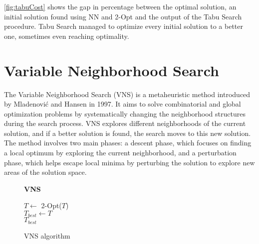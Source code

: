 \figurename{ \ref{fig:tabuCost}} shows the gap in percentage between the optimal solution, an initial solution found using NN and 2-Opt and the output of the Tabu Search procedure.
Tabu Search managed to optimize every initial solution to a better one, sometimes even reaching optimality.



\newpage
\section{Variable Neighborhood Search}

The Variable Neighborhood Search (VNS) is a metaheuristic method introduced by Mladenović and Hansen in 1997\cite{vnsWikipedia}.
It aims to solve combinatorial and global optimization problems by systematically changing the neighborhood structures during the search process.
VNS explores different neighborhoods of the current solution, and if a better solution is found, the search moves to this new solution.
The method involves two main phases: a descent phase, which focuses on finding a local optimum by exploring the current neighborhood, and a perturbation phase, which helps escape local minima by perturbing the solution to explore new areas of the solution space.

\begin{figure}[htbp]
    \textbf{VNS} \\
    \begin{algorithm}[H]
        \BlankLine
        $T \gets$ 2-Opt($T$)\\
        $T_{best} \gets T$\\
        \Return $T_{best}$
    \end{algorithm}
    \caption{VNS algorithm} \label{fig:vnsPseudocode}
\end{figure}

